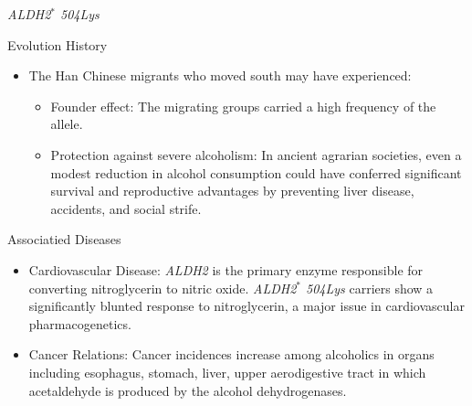 \documentclass[10pt,hyperref={colorlinks,citecolor=blue,urlcolor=peking_blue,linkcolor=}]{beamer}
\theoremstyle{plain}
\begin{document}
\begin{frame}{\textit{ALDH2$^*$ 504Lys}}
    \begin{block}{Evolution History}
        \begin{itemize}   
            \item The Han Chinese migrants who moved south may have experienced:
            \begin{itemize}
                \item Founder effect: The migrating groups carried a high frequency of the allele.
                \item Protection against severe alcoholism: In ancient agrarian societies, even a modest reduction in alcohol consumption could have conferred significant survival and reproductive advantages by preventing liver disease, accidents, and social strife.
            \end{itemize}
        \end{itemize} 
    \end{block}
        
    \begin{block}{Associatied Diseases}
        \begin{itemize}
            \item Cardiovascular Disease: \textit{ALDH2} is the primary enzyme responsible for converting nitroglycerin to nitric oxide. \textit{ALDH2$^*$ 504Lys} carriers show a significantly blunted response to nitroglycerin, a major issue in cardiovascular pharmacogenetics. \citep{liMitochondrialAldehydeDehydrogenase22006}
            \item Cancer Relations: Cancer incidences increase among alcoholics in organs including esophagus, stomach, liver, upper aerodigestive tract in which acetaldehyde is produced by the alcohol dehydrogenases. \citep{yokoyamaAlcoholAldehydeDehydrogenase2001}
        \end{itemize}
    \end{block}
\end{frame}
\end{document}
